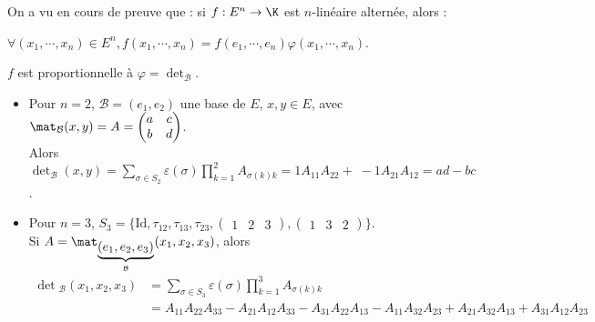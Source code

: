 \documentclass[12pt,a4paper]{report}
\begin{document}
On a vu en cours de preuve que : si $f : E^n \to \K$ est $n$-linéaire alternée, alors :
\begin{center}
$\forall (x_1,\cdots,x_n) \in E^n, f(x_1,\cdots,x_n) = f(e_1,\cdots,e_n)\varphi(x_1,\cdots,x_n)$.
\end{center}

$f$ est proportionnelle à $\varphi = \det_{\mathcal{B}}$. \\

\begin{exemple}{}
\begin{itemize}
	\item Pour $n=2$, $\mathcal{B} = (e_1,e_2)$ une base de $E$, $x,y \in E$, avec $\mat_{\mathcal{B}}(x,y) = A = \begin{pmatrix} a & c \\ b & d \end{pmatrix}$. \\
	
	Alors $\det_{\mathcal{B}}(x,y) = \displaystyle{\sum_{\sigma \in S_2} \varepsilon(\sigma) \prod_{k=1}^2 A_{\sigma(k)k}} = 1 A_{11}A_{22} + \; -1 A_{21}A_{12} = ad-bc$. 
	
	\item Pour $n = 3$, $S_3 = \{\text{Id},\tau_{12},\tau_{13},\tau_{23}, \begin{pmatrix} 1 & 2 & 3 \end{pmatrix}, \begin{pmatrix} 1 & 3 & 2 \end{pmatrix} \}$. \\
	
	Si $A = \mat_{\underbrace{(e_1,e_2,e_3)}_{\mathcal{B}}}(x_1,x_2,x_3)$, alors  
	\begin{align*}
	\det{}_{\mathcal{B}}(x_1,x_2,x_3) &= \sum_{\sigma \in S_3} \varepsilon(\sigma) \prod_{k=1}^3 A_{\sigma(k)k} \\
	&= A_{11}A_{22}A_{33} - A_{21}A_{12}A_{33} - A_{31}A_{22}A_{13} - A_{11}A_{32}A_{23} + A_{21}A_{32}A_{13}+A_{31}A_{12}A_{23}
	\end{align*}
\end{itemize}
\end{exemple}
\end{document}
